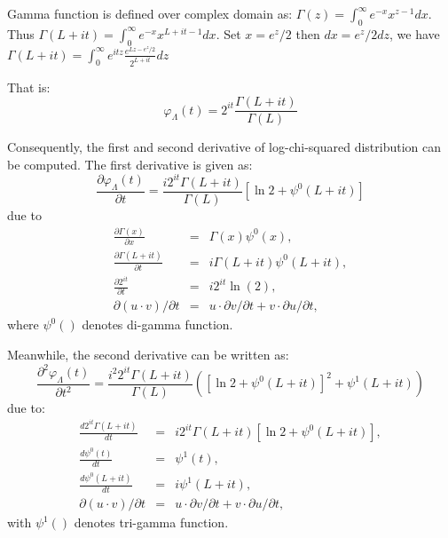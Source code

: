 Gamma function is defined over complex domain as:
$\Gamma(z) = \int_0^\infty  e^{-x} x^{z-1} dx .$
Thus $\Gamma(L+it) = \int_0^\infty  e^{-x} x^{L+it-1} dx .$
Set $x=e^z/2$ then $dx=e^z/2dz$, we have $\Gamma(L+it)= \int_0^\infty  e^{itz} \frac{e^{Lz-e^z/2}}{2^{L+it}} dz$

That is:
\begin{equation}
\varphi_\Lambda(t) = 2^{it} \frac{\Gamma(L+it)}{\Gamma(L)}  
\end{equation}

Consequently, the first and second derivative of log-chi-squared distribution can be computed.
The first derivative is given as:
\begin{equation}
  \frac{\partial \varphi_\Lambda(t)}{\partial t} = \frac{i 2^{it} \Gamma(L+it)}{\Gamma(L)} \left[ \ln{2} + \psi^0(L+it) \right]
\end{equation}
due to
\begin{eqnarray*}
  \frac{\partial \Gamma(x)}{\partial x} &=& \Gamma(x)\psi^0(x), \\
  \frac{\partial \Gamma(L+it)}{\partial t} &=& i\Gamma(L+it)\psi^0(L+it), \\
  \frac{\partial 2^{it}}{\partial t} &=& i2^{it}\ln(2), \\
  \partial (u \cdot v) / \partial t &=& u \cdot \partial v /\partial t + v \cdot \partial u/\partial t, 
\end{eqnarray*}
where $\psi^0()$ denotes di-gamma function.

Meanwhile, the second derivative can be written as:
\begin{equation}
  \frac{\partial ^2 \varphi_\Lambda(t)}{\partial t^2} = \frac{i^2 2^{it} \Gamma(L+it)}{\Gamma(L)} \left( \left[ \ln{2} + \psi^0(L+it) \right] ^ 2 + \psi^1(L+it) \right)
\end{equation}
due to:
\begin{eqnarray*}
  \frac{d 2^{it} \Gamma(L+it)}{dt} &=& i 2^{it} \Gamma(L+it) \left[ \ln{2} + \psi^0(L+it) \right], \\
  \frac{d \psi^0(t)}{dt} &=& \psi^1(t), \\
  \frac{d \psi^0(L+it)}{dt} &=& i \psi^1(L+it), \\
  \partial (u \cdot v) / \partial t &=& u \cdot \partial v /\partial t + v \cdot \partial u/\partial t,
\end{eqnarray*}
with $\psi^1()$ denotes tri-gamma function.

